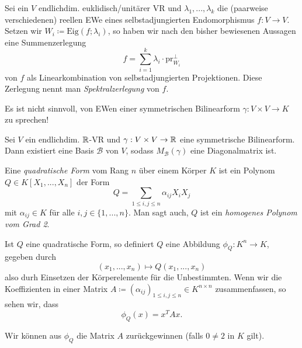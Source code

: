 \documentclass{cheat-sheet}
\newcommand{\Eig}{\mathrm{Eig}}
\newcommand{\BB}{\mathcal{B}}
\begin{document}

\begin{definition}
Sei ein $V$ endlichdim. euklidisch/unitärer VR und $\lambda_1, ..., \lambda_k$ die (paarweise verschiedenen) reellen EWe eines selbstadjungierten Endomorphismus $f : V \to V$. Setzen wir $W_i \coloneqq \Eig(f; \lambda_i)$, so haben wir nach den bisher bewiesenen Aussagen eine Summenzerlegung
\[ f = \sum_{i=1}^k \lambda_i \cdot \mathrm{pr}_{W_i}^{\perp} \]
von $f$ als Linearkombination von selbstadjungierten Projektionen. Diese Zerlegung nennt man \emph{Spektralzerlegung} von $f$.
\end{definition}

\begin{bem}
Es ist nicht sinnvoll, von EWen einer symmetrischen Bilinearform $\gamma : V \times V \to K$ zu sprechen!
\end{bem}

\begin{satz}
Sei $V$ ein endlichdim. $\mathbb{R}$-VR und $\gamma : V \times V \to \mathbb{R}$ eine symmetrische Bilinearform. Dann existiert eine Basis $\BB$ von $V$, sodass $M_{\BB}(\gamma)$ eine Diagonalmatrix ist.
\end{satz}

\begin{definition}
Eine \emph{quadratische Form} vom Rang $n$ über einem Körper $K$ ist ein Polynom $Q \in K[X_1, ..., X_n]$ der Form
\[ Q = \sum_{1 \le i,j \le n} \alpha_{ij} X_i X_j \]
mit $\alpha_{ij} \in K$ für alle $i, j \in \{ 1, ..., n \}$. Man sagt auch, $Q$ ist ein \emph{homogenes Polynom vom Grad 2}.
\end{definition}

\begin{bem}
Ist $Q$ eine quadratische Form, so definiert $Q$ eine Abbildung $\phi_Q : K^n \to K$, gegeben durch
\[ (x_1, ..., x_n) \mapsto Q(x_1, ..., x_n) \]
also durh Einsetzen der Körperelemente für die Unbestimmten. Wenn wir die Koeffizienten in einer Matrix $A \coloneqq (\alpha_{ij})_{1 \le i, j \le n} \in K^{n \times n}$ zusammenfassen, so sehen wir, dass
\[ \phi_Q(x) = x^T A x. \]
\end{bem}

\begin{satz}
Wir können aus $\phi_Q$ die Matrix $A$ zurückgewinnen (falls $0 \not= 2$ in $K$ gilt).
\end{satz}

\end{document}
